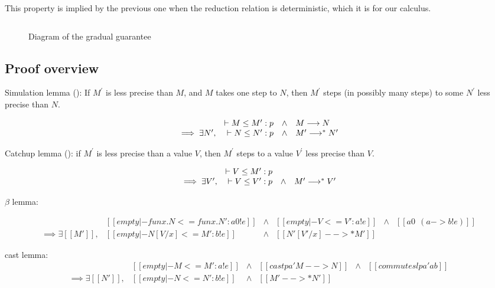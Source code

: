 This property is implied by the previous one when the reduction relation is deterministic, which it is for our calculus.

\begin{figure}
$$

$$
\caption{Diagram of the gradual guarantee}
\label{fig:gg}
\end{figure}

\subsection{Proof overview}

Simulation lemma (): If $M^\prime$ is less precise than $M$, and $M$ takes one step to $N$,
then $M^\prime$ steps (in possibly many steps) to some $N^\prime$ less precise than $N$.

\[
\begin{array}{rrcl}
  & \vdash M \le M^\prime : p & \wedge & M \longrightarrow N
\\ \implies \exists N^\prime , & \vdash N \le N^\prime : p & \wedge & M^\prime \longrightarrow^\ast N^\prime
\end{array}
\]

Catchup lemma (): if $M^\prime$ is less precise than a value $V$, then $M^\prime$ steps
to a value $V^\prime$ less precise than $V$.

\[
\begin{array}{rrcl}
  & \vdash V \le M^\prime : p & &
\\ \implies \exists V^\prime , & \vdash V \le V^\prime : p & \wedge & M^\prime \longrightarrow^\ast V^\prime
\end{array}
\]

$\beta$ lemma:

\[
\begin{array}{rccccc}
    & [[empty |- fun x . N <= fun x . N' : a0 ! e]]
    & \wedge & [[empty |- V <= V' : a ! e]]
    & \wedge & [[a0 ~~ ( a -> b ! e )]]
\\ \implies \exists [[M']],
    & [[empty |- N [ V / x ] <= M' : b ! e]]
    & \wedge & [[N' [ V' / x ] -->* M']]
    & &
\end{array}
\]

cast lemma:
\[
\begin{array}{rccccc}
    & [[empty |- M <= M' : a ! e]]
    & \wedge & [[cast pa' M --> N]]
    & \wedge & [[commutesl pa' a b]]
\\ \implies \exists [[N']],
    & [[empty |- N <= N' : b ! e]]
    & \wedge & [[M' -->* N']]
    & &
\end{array}
\]

